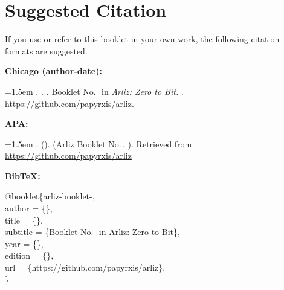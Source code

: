 \chapter*{Suggested Citation}

If you use or refer to this booklet in your own work, the following
citation formats are suggested.

\bigskip

\noindent\textbf{Chicago (author-date):}

\smallskip
\noindent\hangindent=1.5em
\BookletAuthor. \BookletYear. \textit{\BookletTitle.}
Booklet No.\,\BookletNumber\ in \textit{Arliz: Zero to Bit.}
\BookletEdition.
\url{https://github.com/papyrxis/arliz}.

\bigskip

\noindent\textbf{APA:}

\smallskip
\noindent\hangindent=1.5em
\BookletAuthor. (\BookletYear).
\textit{\BookletTitle}
(Arliz Booklet No.\,\BookletNumber, \BookletEdition).
Retrieved from \url{https://github.com/papyrxis/arliz}

\bigskip

\noindent\textbf{BibTeX:}

\medskip
\begin{tcolorbox}[
  colback=codebackground, colframe=border,
  arc=3pt, boxrule=0.4pt,
  fontupper=\ttfamily\small,
  left=6pt, right=6pt, top=5pt, bottom=5pt
]
@booklet\{arliz-booklet-\BookletNumber,\\
\quad author    = \{\BookletAuthor\},\\
\quad title     = \{\BookletTitle\},\\
\quad subtitle  = \{Booklet No.\,\BookletNumber\ in Arliz: Zero to Bit\},\\
\quad year      = \{\BookletYear\},\\
\quad edition   = \{\BookletEdition\},\\
\quad url       = \{https://github.com/papyrxis/arliz\},\\
\}
\end{tcolorbox}
